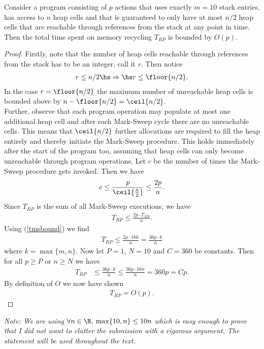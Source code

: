\documentclass{article}
\begin{document}
\begin{claim}
	Consider a program consisting of $p$ actions that uses exactly $m=10$
	stack entries, has access to $n$ heap cells and that is guaranteed to only
	have at most $n/2$ heap cells that are reachable through references
	from the stack at any point in time. Then the total time spent on memory recycling $T_{RP}$ is
	bounded by $O(p)$.
\end{claim}
\begin{proof}
	Firstly, note that the number of heap cells reachable through references
	from the stack has to be an integer, call it $r$. Then notice
	\begin{align*}
		r \leq n / 2 \hs\Rightarrow\hs r \leq \floor{n/2}.
	\end{align*}
	In the case $r=\floor{n/2}$ the maximum number of unreachable heap cells
	is bounded above by $n-\floor{n/2}=\ceil{n/2}$.\\
	\indent Further, observe that each program operation may populate at most one
	additional heap cell and after each Mark-Sweep cycle there are no unreachable cells.
	This means that
	$\ceil{n/2}$ further allocations are required to fill the heap entirely and
	thereby initiate the Mark-Sweep procedure. This holds immediately after
	the start of the program too, assuming that heap cells can only become unreachable
	through program operations. Let $c$ be the number of times the Mark-Sweep
	procedure gets invoked. Then we have
	\begin{align*}
		c \leq \frac{p}{\ceil{\frac{n}{2}}} \leq \frac{2p}{n}.
	\end{align*}
	Since $T_{RP}$ is the sum of all Mark-Sweep executions, we have
	\begin{align*}
		T_{RP} \leq\frac{2p \cdot T_{MS}}{n}.
	\end{align*}
	Using (\ref{tmsbound}) we find
	\begin{align}
		\label{trbound}
		T_{RP}\leq\frac{2p\cdot 18k}{n}=\frac{36p\cdot k}{n}
	\end{align}
	where $k=\max\{m,n\}$. Now let $P=1$, $N=10$ and $C=360$ be constants. Then
	for all $p\geq P$ or $n\geq N$ we have
	\begin{align*}
		T_{RP} & \leq \frac{36p\cdot k}{n} \leq \frac{36p\cdot 10n}{n} = 360p = Cp.
	\end{align*}
	By definition of $O$ we now have shown
	\begin{align*}
		T_{RP} = O(p).
	\end{align*}
\end{proof}
\emph{Note: We are using $\forall n\in\N,\:\max\{10,n\}\leq 10n$ which is
	easy enough to prove that I did not want to clutter the submission with a
	rigorous argument. The statement will be used throughout the text.}
\end{document}
